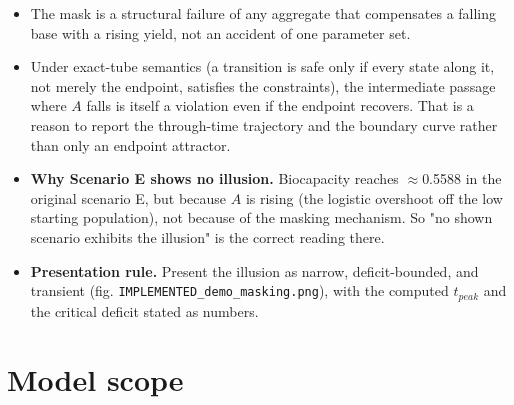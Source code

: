 \documentclass[11pt]{article}
\begin{document}
\begin{itemize}
\item The mask is a structural failure of any aggregate that compensates a falling base with a rising yield, not an accident of one parameter set.
\item Under exact-tube semantics (a transition is safe only if every state along it, not merely the endpoint, satisfies the constraints), the intermediate passage where $A$ falls is itself a violation even if the endpoint recovers. That is a reason to report the through-time trajectory and the boundary curve rather than only an endpoint attractor.
\item \textbf{Why Scenario E shows no illusion.} Biocapacity reaches \ensuremath{\approx{}}0.5588 in the original scenario E, but because $A$ is rising (the logistic overshoot off the low starting population), not because of the masking mechanism. So "no shown scenario exhibits the illusion" is the correct reading there.
\item \textbf{Presentation rule.} Present the illusion as narrow, deficit-bounded, and transient (fig. \texttt{IMPLEMENTED\_demo\_masking.png}), with the computed $t_{peak}$ and the critical deficit stated as numbers.
\end{itemize}

\section{Model scope}
\end{document}
